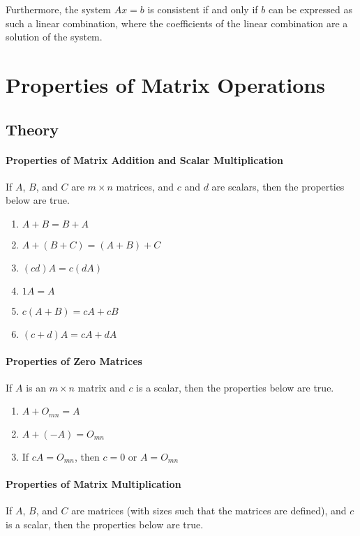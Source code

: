 \documentclass{report}
\begin{document}
\noindent Furthermore, the system $Ax=b$ is consistent if and only if $b$ can be expressed as such a linear combination, where the coefficients of the linear combination are a solution of the system.

\section{Properties of Matrix Operations}

\subsection{Theory}

\paragraph{Properties of Matrix Addition and Scalar Multiplication} If $A$, $B$, and $C$ are $m \times n$ matrices, and $c$ and $d$ are scalars, then the properties below are true.

\begin{enumerate}
    \item $A +B = B + A$
    \item $A + (B+C) = (A+B) + C$
    \item $(cd)A = c(dA)$
    \item $1A = A$
    \item $c(A+B) = cA + cB$
    \item $(c+d)A = cA + dA$
\end{enumerate}

\paragraph{Properties of Zero Matrices} If $A$ is an $m \times n$ matrix and $c$ is a scalar, then the properties below are true.
\begin{enumerate}
    \item $A + O_{mn} = A$
    \item $A + (-A) = O_{mn}$
    \item If $cA = O_{mn}$, then $c=0$ or $A=O_{mn}$
\end{enumerate}

\paragraph{Properties of Matrix Multiplication} If $A$, $B$, and $C$ are matrices (with sizes such that the matrices are defined), and $c$ is a scalar, then the properties below are true.
\end{document}

